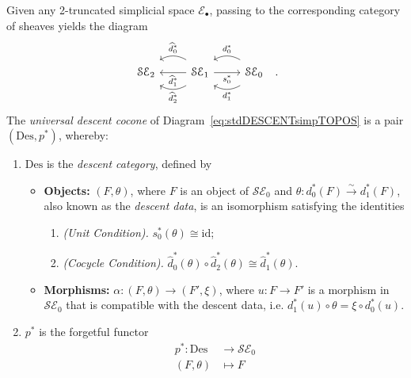 \documentclass[a4paper, 11pt,reqno]{amsart}
\newcommand{\id}{\mathrm{id}}
\newcommand{\baseS}{\mathcal{S}}
\newcommand{\Des}{\mathrm{Des}}
\newcommand{\E}{\mathcal{E}}
\begin{document}
\begin{construction}\label{cons:stdDESCENT} Given any 2-truncated simplicial space $\E_{\bullet}$, passing to the corresponding category of sheaves yields the diagram 
	\begin{equation}\label{eq:stdDESCENTsimpTOPOS}
	\begin{tikzcd}\baseS\E_2 & \baseS\E_1 \ar[l, bend right, shift right=1ex, swap, "\widehat{d}^*_0"] \ar[l,"\widehat{d}^*_1"] \ar[l,bend left, shift left=1ex,  "\widehat{d}^*_2"] \ar[r, swap,"s^*_0"] & \ar[l, bend right,shift right=1ex, swap, "d^*_0"] \ar[l, bend left, shift left=1ex, "d^*_1"] \baseS\E_0 \end{tikzcd}\,\,\,\,.
	\end{equation}
The {\em universal descent cocone} of Diagram~\eqref{eq:stdDESCENTsimpTOPOS} is a pair $(\Des,p^*)$, whereby:
	\begin{enumerate}%
	\item $\Des$ is the {\em descent category}, defined by
	\begin{itemize}
		\item[] \textbf{Objects:} $(F,\theta)$, where $F$ is an object of $\baseS\mathcal{E}_0$
		and $\theta:d_0^*(F)\xrightarrow{\sim} d^*_1(F)$, also known as the \textit{descent data}, is an isomorphism satisfying the identities
		\begin{enumerate}[label=(\roman*)]
			\item \emph{(Unit Condition).}  $s^*_0(\theta)\cong \id$;
			\item \emph{(Cocycle Condition).}  $\widehat{d}^*_0(\theta)\circ \widehat{d}^*_2(\theta)\cong \widehat{d}_1^*(\theta)$.
		\end{enumerate}
	\smallskip
	
		\item[] \textbf{Morphisms:} $\alpha\colon (F,\theta)\rightarrow (F',\xi)$, where  $u\colon F\rightarrow F'$ is a morphism in $\baseS\mathcal{E}_0$ that is compatible with the descent data, i.e. $d_1^*(u)\circ\theta=\xi\circ d_0^*(u)$.
	\end{itemize}
	\item  $p^*$ is the forgetful functor
	\begin{align*}
	p^*\colon \Des&\longrightarrow \baseS\E_0\\
	(F,\theta)&\longmapsto F
	\end{align*}
\end{enumerate}
\end{construction} 
\end{document}
